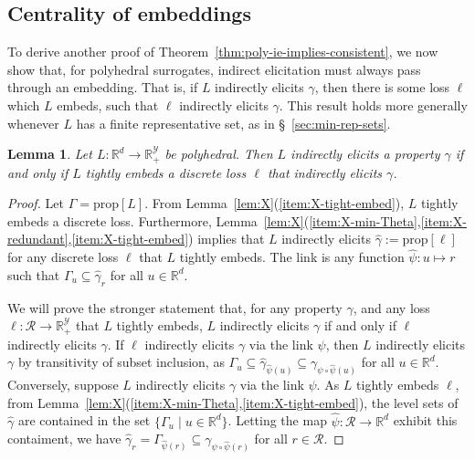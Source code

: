 \documentclass[11pt]{article}
\newcommand{\reals}{\mathbb{R}}
\newcommand{\prop}[1]{\mathrm{prop}[#1]}
\newcommand{\R}{\mathcal{R}}
\newcommand{\Y}{\mathcal{Y}}
\newtheorem{lemma}{Lemma}
\begin{document}
\subsection{Centrality of embeddings}

To derive another proof of Theorem~\ref{thm:poly-ie-implies-consistent}, we now show that, for polyhedral surrogates, indirect elicitation must always pass through an embedding.
That is, if $L$ indirectly elicits $\gamma$, then there is some loss $\ell$ which $L$ embeds, such that $\ell$ indirectly elicits $\gamma$.
This result holds more generally whenever $L$ has a finite representative set, as in \S~\ref{sec:min-rep-sets}.
\begin{lemma}\label{lem:ie-iff-embeds-refinement}
  Let $L:\reals^d\to\reals^\Y_+$ be polyhedral.
  Then $L$ indirectly elicits a property $\gamma$ if and only if $L$ tightly embeds a discrete loss $\ell$ that indirectly elicits $\gamma$.
\end{lemma}
\begin{proof}
  Let $\Gamma = \prop L$.
From Lemma~\ref{lem:X}(\ref{item:X-tight-embed}), $L$ tightly embeds a discrete loss.
  Furthermore, Lemma~\ref{lem:X}(\ref{item:X-min-Theta},\ref{item:X-redundant},\ref{item:X-tight-embed}) implies that $L$ indirectly elicits $\hat\gamma := \prop \ell$ for any discrete loss $\ell$ that $L$ tightly embeds.
  The link is any function $\hat\psi: u \mapsto r$ such that $\Gamma_u \subseteq \hat\gamma_r$ for all $u \in \reals^d$.

  We will prove the stronger statement that, for any property $\gamma$, and any loss $\ell:\R\to\reals^\Y_+$ that $L$ tightly embeds, $L$ indirectly elicits $\gamma$ if and only if $\ell$ indirectly elicits $\gamma$.
  If $\ell$ indirectly elicits $\gamma$ via the link $\psi$, then $L$ indirectly elicits $\gamma$ by transitivity of subset inclusion, as $\Gamma_u \subseteq \hat\gamma_{\hat\psi(u)} \subseteq \gamma_{\psi \circ \hat\psi(u)}$ for all $u \in \reals^d$.
  Conversely, suppose $L$ indirectly elicits $\gamma$ via the link $\psi$.
  As $L$ tightly embeds $\ell$, from Lemma~\ref{lem:X}(\ref{item:X-min-Theta},\ref{item:X-tight-embed}), the level sets of $\hat \gamma$ are contained in the set $\{\Gamma_u \mid u\in\reals^d\}$.
  Letting the map $\hat\psi:\R\to\reals^d$ exhibit this contaiment, we have $\hat\gamma_r = \Gamma_{\hat\psi(r)} \subseteq \gamma_{\psi \circ \hat\psi (r)}$ for all $r\in\R$.
\end{proof}
\end{document}
